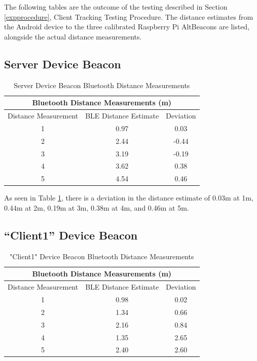 \documentclass[11pt,a4paper,headinclude=false,footinclude=false]{scrreprt}
\begin{document}
The following tables are the outcome of the testing described in Section
\ref{expprocedure}, Client Tracking Testing Procedure. The distance
estimates from the Android device to the three calibrated Raspberry Pi
AltBeacons are listed, alongside the actual distance measurements.

\subsection{Server Device Beacon}\label{server-device-beacon}

\begin{table}[H]
\centering
    \begin{tabular}{||c|c|c||}
    \hline
    \multicolumn{3}{|c|}{\textbf{Bluetooth Distance Measurements (m)}} \\
    \hline\hline
    Distance Measurement & BLE Distance Estimate & Deviation \\
    \hline
    1 & 0.97 & 0.03 \\
    \hline
    2 & 2.44 & -0.44 \\
    \hline
    3 & 3.19 & -0.19 \\
    \hline
    4 & 3.62 & 0.38 \\
    \hline
    5 & 4.54 & 0.46 \\
    \hline\hline
    \end{tabular}
    \caption{Server Device Beacon Bluetooth Distance Measurements}
    \label{serverBLEmeasurement}
\end{table}

As seen in Table \ref{serverBLEmeasurement}, there is a deviation in the
distance estimate of 0.03m at 1m, 0.44m at 2m, 0.19m at 3m, 0.38m at 4m,
and 0.46m at 5m.

\subsection{\texorpdfstring{``Client1'' Device
Beacon}{Client1 Device Beacon}}\label{client1-device-beacon}

\begin{table}[H]
\centering
    \begin{tabular}{||c|c|c||}
    \hline
    \multicolumn{3}{|c|}{\textbf{Bluetooth Distance Measurements (m)}} \\
    \hline\hline
    Distance Measurement & BLE Distance Estimate & Deviation \\
    \hline
    1 & 0.98 & 0.02 \\
    \hline
    2 & 1.34 & 0.66 \\
    \hline
    3 & 2.16 & 0.84 \\
    \hline
    4 & 1.35 & 2.65 \\
    \hline
    5 & 2.40 & 2.60 \\
    \hline\hline
    \end{tabular}
    \caption{"Client1" Device Beacon Bluetooth Distance Measurements}
    \label{client1BLEmeasurement}
\end{table}
\end{document}
